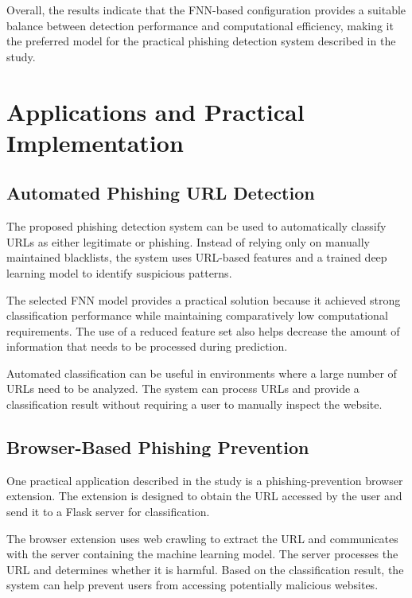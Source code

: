 \documentclass[12pt,a4paper]{report}
\begin{document}
Overall, the results indicate that the FNN-based configuration provides a suitable balance between detection performance and computational efficiency, making it the preferred model for the practical phishing detection system described in the study.


\chapter{Applications and Practical Implementation}

\section{Automated Phishing URL Detection}

The proposed phishing detection system can be used to automatically classify URLs as either legitimate or phishing. Instead of relying only on manually maintained blacklists, the system uses URL-based features and a trained deep learning model to identify suspicious patterns.

The selected FNN model provides a practical solution because it achieved strong classification performance while maintaining comparatively low computational requirements. The use of a reduced feature set also helps decrease the amount of information that needs to be processed during prediction.

Automated classification can be useful in environments where a large number of URLs need to be analyzed. The system can process URLs and provide a classification result without requiring a user to manually inspect the website.

\section{Browser-Based Phishing Prevention}

One practical application described in the study is a phishing-prevention browser extension. The extension is designed to obtain the URL accessed by the user and send it to a Flask server for classification.


The browser extension uses web crawling to extract the URL and communicates with the server containing the machine learning model. The server processes the URL and determines whether it is harmful. Based on the classification result, the system can help prevent users from accessing potentially malicious websites.
\end{document}
